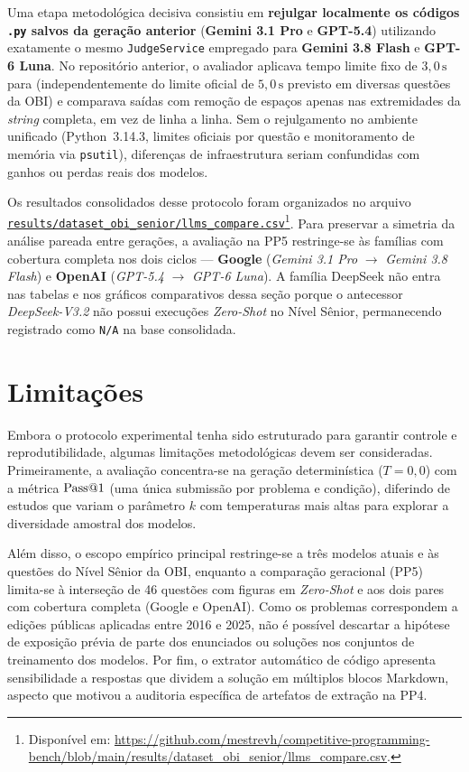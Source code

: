 Uma etapa metodológica decisiva consistiu em \textbf{rejulgar localmente os códigos \texttt{.py} salvos da geração anterior} (\textbf{Gemini 3.1 Pro} e \textbf{GPT-5.4}) utilizando exatamente o mesmo \texttt{JudgeService} empregado para \textbf{Gemini 3.8 Flash} e \textbf{GPT-6 Luna}. No repositório anterior, o avaliador aplicava tempo limite fixo de $3{,}0\,\mathrm{s}$ para  (independentemente do limite oficial de $5{,}0\,\mathrm{s}$ previsto em diversas questões da OBI) e comparava saídas com remoção de espaços apenas nas extremidades da \textit{string} completa, em vez de linha a linha. Sem o rejulgamento no ambiente unificado (Python~3.14.3, limites oficiais por questão e monitoramento de memória via \texttt{psutil}), diferenças de infraestrutura seriam confundidas com ganhos ou perdas reais dos modelos.

Os resultados consolidados desse protocolo foram organizados no arquivo \href{https://github.com/mestrevh/competitive-programming-bench/blob/main/results/dataset_obi_senior/llms_compare.csv}{\texttt{results/dataset\_obi\_senior/llms\_compare.csv}}\footnote{Disponível em: \url{https://github.com/mestrevh/competitive-programming-bench/blob/main/results/dataset_obi_senior/llms_compare.csv}.}. Para preservar a simetria da análise pareada entre gerações, a avaliação na PP5 restringe-se às famílias com cobertura completa nos dois ciclos --- \textbf{Google} (\textit{Gemini 3.1 Pro} $\rightarrow$ \textit{Gemini 3.8 Flash}) e \textbf{OpenAI} (\textit{GPT-5.4} $\rightarrow$ \textit{GPT-6 Luna}). A família DeepSeek não entra nas tabelas e nos gráficos comparativos dessa seção porque o antecessor \textit{DeepSeek-V3.2} não possui execuções  \textit{Zero-Shot} no Nível Sênior, permanecendo registrado como \texttt{N/A} na base consolidada.

\section{Limitações}\label{sec:conc-limitacoes}

Embora o protocolo experimental tenha sido estruturado para garantir controle e reprodutibilidade, algumas limitações metodológicas devem ser consideradas. Primeiramente, a avaliação concentra-se na geração determinística ($T = 0{,}0$) com a métrica $\mathrm{Pass@}1$ (uma única submissão por problema e condição), diferindo de estudos que variam o parâmetro $k$ com temperaturas mais altas para explorar a diversidade amostral dos modelos.

Além disso, o escopo empírico principal restringe-se a três modelos atuais e às questões do Nível Sênior da OBI, enquanto a comparação geracional (PP5) limita-se à interseção de 46 questões com figuras em  \textit{Zero-Shot} e aos dois pares com cobertura completa (Google e OpenAI). Como os problemas correspondem a edições públicas aplicadas entre 2016 e 2025, não é possível descartar a hipótese de exposição prévia de parte dos enunciados ou soluções nos conjuntos de treinamento dos modelos. Por fim, o extrator automático de código apresenta sensibilidade a respostas que dividem a solução em múltiplos blocos Markdown, aspecto que motivou a auditoria específica de artefatos de extração na PP4.